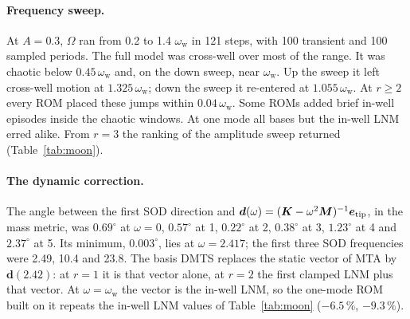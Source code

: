 \documentclass[11pt]{article}
\begin{document}
\paragraph{Frequency sweep.} At $A=0.3$, $\varOmega$ ran from 0.2 to 1.4 $\omega_{\mathrm w}$ in 121 steps, with 100 transient and 100 sampled periods. The full model was cross-well over most of the range. It was chaotic below $0.45\,\omega_{\mathrm w}$ and, on the down sweep, near $\omega_{\mathrm w}$. Up the sweep it left cross-well motion at $1.325\,\omega_{\mathrm w}$; down the sweep it re-entered at $1.055\,\omega_{\mathrm w}$. At $r\ge2$ every ROM placed these jumps within $0.04\,\omega_{\mathrm w}$. Some ROMs added brief in-well episodes inside the chaotic windows. At one mode all bases but the in-well LNM erred alike. From $r=3$ the ranking of the amplitude sweep returned (Table~\ref{tab:moon}).
\paragraph{The dynamic correction.} The angle between the first SOD direction and $\bm{d}(\omega)=(\bm{K}-\omega^2\bm{M})^{-1}\bm{e}_{\mathrm{tip}}$, in the mass metric, was $0.69^\circ$ at $\omega=0$, $0.57^\circ$ at 1, $0.22^\circ$ at 2, $0.38^\circ$ at 3, $1.23^\circ$ at 4 and $2.37^\circ$ at 5. Its minimum, $0.003^\circ$, lies at $\omega=2.417$; the first three SOD frequencies were 2.49, 10.4 and 23.8. The basis DMTS replaces the static vector of MTA by $\bm{d}(2.42)$: at $r=1$ it is that vector alone, at $r=2$ the first clamped LNM plus that vector. At $\omega=\omega_{\mathrm w}$ the vector is the in-well LNM, so the one-mode ROM built on it repeats the in-well LNM values of Table~\ref{tab:moon} ($-6.5\,\%$, $-9.3\,\%$).
\end{document}
